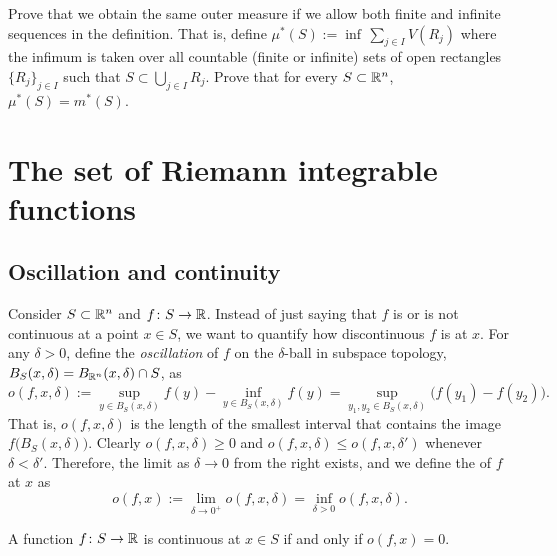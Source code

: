 \begin{exercise} \label{exercise:allowfiniteseqsinoutermeasure}
Prove that we obtain the same outer measure if we allow both finite and
infinite sequences in
the definition.  That is, define $\mu^*(S) := \inf\, \sum_{j \in I} V(R_j)$
where the infimum is taken over all countable (finite or infinite) sets of
open rectangles $\{ R_j \}_{j\in I}$ such that $S \subset
\bigcup_{j \in I} R_j$.  Prove that for every $S \subset {\mathbb{R}}^n$,
$\mu^*(S) = m^*(S)$.
\end{exercise}



\sectionnewpage
\section{The set of Riemann integrable functions }
\label{sec:riemannlebesgue}


\subsection{Oscillation and continuity}

Consider
$S \subset {\mathbb{R}}^n$ and $f \colon S \to {\mathbb{R}}$.
Instead of just saying that $f$ is or is not continuous at
a point $x \in S$,
we want to quantify how discontinuous $f$ is 
at $x$.  For any $\delta > 0$, define the \emph{oscillation} of 
$f$ on the $\delta$-ball in subspace topology,
$B_S(x,\delta) = B_{{\mathbb{R}}^n}(x,\delta) \cap S$, as
\begin{equation*}
o(f,x,\delta) :=
{\sup_{y \in B_S(x,\delta)} f(y)}
-
{\inf_{y \in B_S(x,\delta)} f(y)}
= 
\sup_{y_1,y_2 \in B_S(x,\delta)} \bigl(f(y_1)-f(y_2)\bigr) .
\end{equation*}
That is, $o(f,x,\delta)$ is the length of the smallest interval
that contains the image $f\bigl(B_S(x,\delta)\bigr)$.
Clearly $o(f,x,\delta) \geq 0$ and
$o(f,x,\delta) \leq o(f,x,\delta')$ whenever $\delta < \delta'$.
Therefore, the limit as $\delta \to 0$ from the right exists, and
we define the \emph{} of $f$
at $x$ as
\begin{equation*}
o(f,x) :=
\lim_{\delta \to 0^+}
o(f,x,\delta) =
\inf_{\delta > 0}
o(f,x,\delta) .
\end{equation*}

\begin{prop}
A function
$f \colon S \to {\mathbb{R}}$ is continuous at $x \in S$ if and only if $o(f,x) = 0$.
\end{prop}

